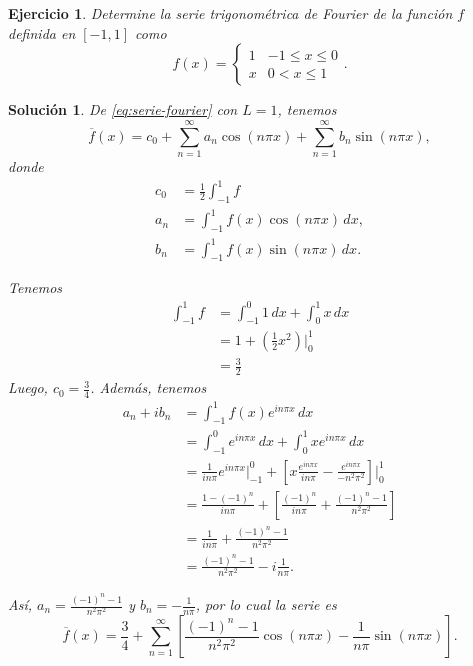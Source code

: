 \documentclass[11pt,letterpaper]{report}
\newtheorem{exe}[defn]{Ejercicio}
\newtheorem*{sol}{Solución}
\newcommand\<{\langle}
\renewcommand\>{\rangle}
\begin{document}
\begin{exe}\label{ejemplo-fourier}
  Determine la serie trigonométrica de Fourier de la función $f$
  definida en $[-1,1]$ como
  \[
    f(x) =
    \begin{cases}
      1 & -1\leq x\leq 0 \\
      x & 0<x\leq 1
    \end{cases}
  .\]
\end{exe}
\begin{sol}
  De \eqref{eq:serie-fourier} con $L=1$, tenemos
  \[
    \overline{f}(x) = c_0
    + \sum_{n=1}^\infty a_n\cos(n\pi x)
    + \sum_{n=1}^\infty b_n\sin(n\pi x)
  ,\]
  donde
  \begin{align*}
    c_0 &= \frac{1}{2}\int_{-1}^1 f \\
    a_n &= \int_{-1}^1 f(x)\cos(n\pi x)\,dx, \\
    b_n &= \int_{-1}^1 f(x)\sin(n\pi x)\,dx.
  \end{align*}

  Tenemos
  \begin{align*}
    \int_{-1}^{1}f
    &= \int_{-1}^{0}1\,dx + \int_{0}^{1}x\,dx \\
    &= 1 + \left( \frac{1}{2}x^{2} \right)\Big|_{0}^{1} \\
    &= \frac{3}{2}
  \end{align*}
  Luego, $c_0=\frac{3}{4}$.
  Además, tenemos
  \begin{align*}
    a_n+ib_n
    &= \int_{-1}^{1}f(x)e^{in\pi x}\,dx \\
    &= \int_{-1}^{0}e^{in\pi x}\,dx
     + \int_{0}^{1}xe^{in\pi x}\,dx \\
    &= \frac{1}{in\pi}e^{in\pi x}\Big|_{-1}^{0}
     + \left[
       x \frac{e^{in\pi x}}{in\pi}
       -
       \frac{e^{in\pi x}}{-n^{2}\pi^{2}}
     \right]\Big|_{0}^{1} \\
    &= \frac{1-(-1)^{n}}{in\pi}
     + \left[
       \frac{(-1)^{n}}{in\pi}
       + \frac{(-1)^{n}-1}{n^{2}\pi^{2}}
     \right] \\
    &= \frac{1}{in\pi}
     + \frac{(-1)^{n}-1}{n^{2}\pi^{2}} \\
    &=
     \frac{(-1)^{n}-1}{n^{2}\pi^{2}}
     -i \frac{1}{n\pi}.
  \end{align*}

  Así, $a_n=\frac{(-1)^{n}-1}{n^{2}\pi^{2}}$ y $b_n=-\frac{1}{n\pi}$,
  por lo cual la serie es
  \[
    \overline{f}(x)
    =
    \frac{3}{4}
    +
    \sum_{n=1}^{\infty}
    \left[
      \frac{(-1)^{n}-1}{n^{2}\pi^{2}}\cos(n\pi x)
      -\frac{1}{n\pi}\sin(n\pi x)
    \right]
  .\]
    
\end{sol}
\end{document}
